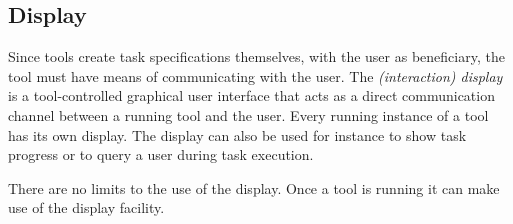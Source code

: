 \documentclass{article}
\begin{document}


  \subsection{Display}

   Since tools create task specifications themselves, with the user as
   beneficiary, the tool must have means of communicating with the user. The
   \textit{(interaction) display} is a tool-controlled graphical user interface
   that acts as a direct communication channel between a running tool and the
   user. Every running instance of a tool has its own display. The display can
   also be used for instance to show task progress or to query a user during
   task execution.

   There are no limits to the use of the display. Once a tool is running it can
   make use of the display facility.


\end{document}
